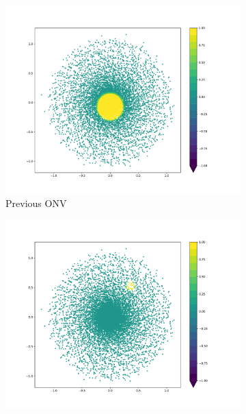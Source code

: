 \documentclass[../taasin.tex]{subfiles}
\begin{document}
\begin{figure}
    \centering
    \begin{subfigure}[b]{0.45\textwidth}
        \centering
        \includegraphics[width=\textwidth]{figures/onv_normal_prev.pdf}
        \caption{Previous ONV}
        \label{fig:onv_prev}
    \end{subfigure}
    \hfill
    \begin{subfigure}[b]{0.45\textwidth}
        \centering
        \includegraphics[width=\textwidth]{figures/onv_normal_cur.pdf}

\end{subfigure}
\end{figure}
\end{document}
